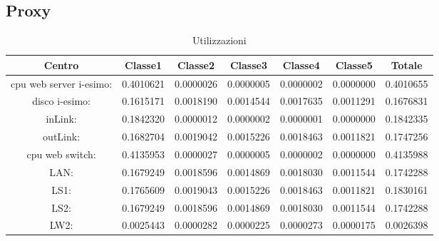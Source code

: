 \subsection{Proxy}
\begin{table}[H]
\begin{center}\begin{scriptsize}
\begin{tabular}{||c|c|c|c|c|c|c||}
\hline
Centro &Classe1 &Classe2 &Classe3 &Classe4 &Classe5 &Totale\\
\hline
\hline
 cpu web server i-esimo: 	&0.4010621	&0.0000026	&0.0000005	&0.0000002	&0.0000000	&0.4010655	\\\hline
 disco i-esimo: 	&0.1615171	&0.0018190	&0.0014544	&0.0017635	&0.0011291	&0.1676831	\\\hline
 inLink: 	&0.1842320	&0.0000012	&0.0000002	&0.0000001	&0.0000000	&0.1842335	\\\hline
 outLink: 	&0.1682704	&0.0019042	&0.0015226	&0.0018463	&0.0011821	&0.1747256	\\\hline
 cpu web switch: 	&0.4135953	&0.0000027	&0.0000005	&0.0000002	&0.0000000	&0.4135988	\\\hline
 LAN: 	&0.1679249	&0.0018596	&0.0014869	&0.0018030	&0.0011544	&0.1742288	\\\hline
 LS1: 	&0.1765609	&0.0019043	&0.0015226	&0.0018463	&0.0011821	&0.1830161	\\\hline
 LS2:	&0.1679249	&0.0018596	&0.0014869	&0.0018030	&0.0011544	&0.1742288	\\\hline
 LW2: 	&0.0025443	&0.0000282	&0.0000225	&0.0000273	&0.0000175	&0.0026398	\\\hline
\end{tabular}
\end{scriptsize}\end{center}
\caption{Utilizzazioni}
\label{utilizzazioni}
\end{table}

